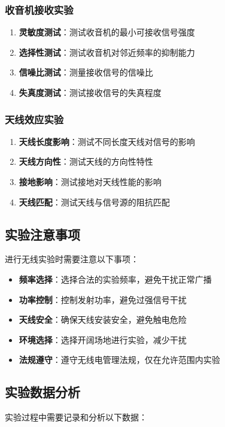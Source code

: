 \documentclass[12pt,UTF8]{ctexbook}
\begin{document}
\subsubsection{收音机接收实验}
\begin{enumerate}[leftmargin=2cm]
	\item \textbf{灵敏度测试}：测试收音机的最小可接收信号强度
	\item \textbf{选择性测试}：测试收音机对邻近频率的抑制能力
	\item \textbf{信噪比测试}：测量接收信号的信噪比
	\item \textbf{失真度测试}：测试接收信号的失真程度
\end{enumerate}

\subsubsection{天线效应实验}
\begin{enumerate}[leftmargin=2cm]
	\item \textbf{天线长度影响}：测试不同长度天线对信号的影响
	\item \textbf{天线方向性}：测试天线的方向性特性
	\item \textbf{接地影响}：测试接地对天线性能的影响
	\item \textbf{天线匹配}：测试天线与信号源的阻抗匹配
\end{enumerate}

\subsection{实验注意事项}
进行无线实验时需要注意以下事项：

\begin{itemize}[leftmargin=2cm]
	\item \textbf{频率选择}：选择合法的实验频率，避免干扰正常广播
	\item \textbf{功率控制}：控制发射功率，避免过强信号干扰
	\item \textbf{天线安全}：确保天线安装安全，避免触电危险
	\item \textbf{环境选择}：选择开阔场地进行实验，减少干扰
	\item \textbf{法规遵守}：遵守无线电管理法规，仅在允许范围内实验
\end{itemize}

\subsection{实验数据分析}
实验过程中需要记录和分析以下数据：
\end{document}
